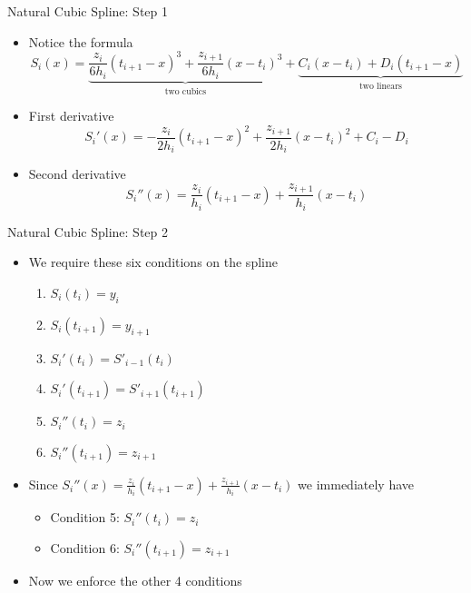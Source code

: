 \documentclass[10pt]{beamer}
\begin{document}
\begin{frame}{Natural Cubic Spline: Step 1}

\begin{itemize}
\item Notice the formula
    \begin{equation*}
      S_i(x) = \underbrace{\frac{z_i}{6h_i}(t_{i+1}-x)^3 +\frac{z_{i+1}}{6h_i}(x-t_i)^3}_{\text{two cubics}} + \underbrace{C_i(x-t_i) + D_i(t_{i+1}-x)}_{\text{two linears}}
    \end{equation*}
  
\item First derivative 
$$
    S_i'(x) = -\frac{z_i}{2h_i}(t_{i+1}-x)^2 +\frac{z_{i+1}}{2h_i}(x-t_i)^2 + C_i -D_i
$$
\item Second derivative
$$
    S_i''(x) = \frac{z_i}{h_i}(t_{i+1}-x) +\frac{z_{i+1}}{h_i}(x-t_i) 
$$
\end{itemize}
   
\end{frame}
\begin{frame}{Natural Cubic Spline: Step 2}

\begin{itemize}
\item We require these six conditions on the spline
\begin{enumerate}
    \item $S_i(t_i)=y_i$
    \item $S_i(t_{i+1})=y_{i+1}$
    \item $S_i'(t_{i})=S'_{i-1}(t_i)$
    \item $S_i'(t_{i+1})=S'_{i+1}(t_{i+1})$
    \item $S_i''(t_{i})=z_i$
    \item $S_i''(t_{i+1})=z_{i+1}$
\end{enumerate}
\vfill
    \item Since $S_i''(x) = \frac{z_i}{h_i}(t_{i+1}-x) +\frac{z_{i+1}}{h_i}(x-t_i)$ we immediately have 
    \begin{itemize}
            \item Condition 5: $S_i''(t_{i})=z_i$
    \item Condition 6: $S_i''(t_{i+1})=z_{i+1}$
    \end{itemize}
    \vfill 
    \item Now we enforce the other 4 conditions
\end{itemize}
   
\end{frame}
\end{document}
